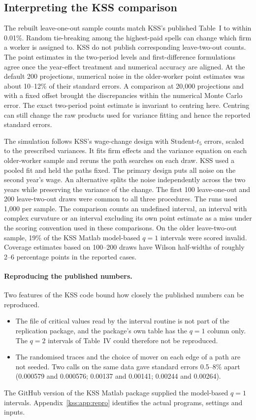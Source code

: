 \subsection{Interpreting the KSS comparison}
The rebuilt leave-one-out sample counts match KSS's published Table~I
to within 0.01\%. Random tie-breaking among the highest-paid spells can
change which firm a worker is assigned to. KSS do not publish corresponding
leave-two-out counts. The point estimates in the two-period levels and
first-difference formulations agree once the year-effect treatment and
numerical accuracy are aligned. At the default 200 projections, numerical
noise in the older-worker point estimates was about 10--12\% of their
standard errors. A comparison at 20,000 projections and with a fixed
offset brought the discrepancies within the numerical Monte Carlo error.
The exact two-period point estimate is invariant to centring here.
Centring can still change the raw products used for variance fitting and
hence the reported standard errors.

The simulation follows KSS's wage-change design with Student-$t_5$ errors,
scaled to the prescribed variances. It fits firm effects and the variance
equation on each older-worker sample and reruns the path searches on each
draw. KSS used a pooled fit and held the paths fixed. The primary design
puts all noise on the second year's wage. An alternative splits the noise
independently across the two years while preserving the variance of the
change. The first 100 leave-one-out and 200 leave-two-out draws were common
to all three procedures. The \fevc{} runs used 1,000 per sample. The
comparison counts an undefined interval, an interval with complex curvature
or an interval excluding its own point estimate as a miss under the scoring convention used in these comparisons. On the older leave-two-out sample, 19\%
of the KSS Matlab model-based $q=1$ intervals were scored invalid.
Coverage estimates based on 100--200 draws have Wilson half-widths of
roughly 2--6 percentage points in the reported cases.

\paragraph{Reproducing the published numbers.}
Two features of the KSS code bound how closely the published numbers can be
reproduced.
\begin{itemize}
\item The file of critical values read by the interval routine is not part of the
replication package, and the package's own table has the $q=1$ column only. The
$q=2$ intervals of Table~IV could therefore not be reproduced.
\item The randomised traces and the choice of mover on each edge of a path are not
seeded. Two calls on the same data gave standard errors 0.5--8\% apart (0.000579
and 0.000576; 0.00137 and 0.00141; 0.00244 and 0.00264).
\end{itemize}
The GitHub version of the KSS Matlab package supplied the model-based $q=1$
intervals.
Appendix~\ref{kss:app:repro} identifies
the actual programs, settings and inputs.
